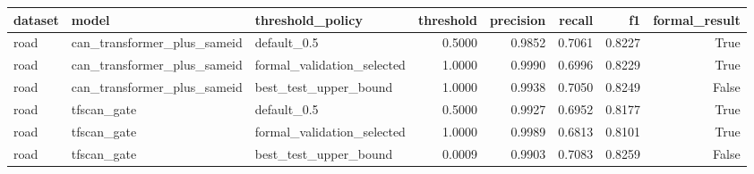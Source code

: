 \begin{tabular}{lllrrrrr}
\toprule
dataset & model & threshold\_policy & threshold & precision & recall & f1 & formal\_result \\
\midrule
road & can\_transformer\_plus\_sameid & default\_0.5 & 0.5000 & 0.9852 & 0.7061 & 0.8227 & True \\
road & can\_transformer\_plus\_sameid & formal\_validation\_selected & 1.0000 & 0.9990 & 0.6996 & 0.8229 & True \\
road & can\_transformer\_plus\_sameid & best\_test\_upper\_bound & 1.0000 & 0.9938 & 0.7050 & 0.8249 & False \\
road & tfscan\_gate & default\_0.5 & 0.5000 & 0.9927 & 0.6952 & 0.8177 & True \\
road & tfscan\_gate & formal\_validation\_selected & 1.0000 & 0.9989 & 0.6813 & 0.8101 & True \\
road & tfscan\_gate & best\_test\_upper\_bound & 0.0009 & 0.9903 & 0.7083 & 0.8259 & False \\
\bottomrule
\end{tabular}
